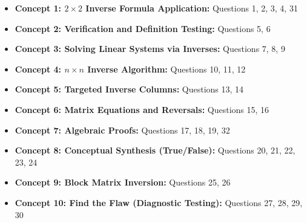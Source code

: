 \documentclass{article}
\begin{document}
\begin{itemize}
    \item \textbf{Concept 1: $2 \times 2$ Inverse Formula Application:} Questions 1, 2, 3, 4, 31
    \item \textbf{Concept 2: Verification and Definition Testing:} Questions 5, 6
    \item \textbf{Concept 3: Solving Linear Systems via Inverses:} Questions 7, 8, 9
    \item \textbf{Concept 4: $n \times n$ Inverse Algorithm:} Questions 10, 11, 12
    \item \textbf{Concept 5: Targeted Inverse Columns:} Questions 13, 14
    \item \textbf{Concept 6: Matrix Equations and Reversals:} Questions 15, 16
    \item \textbf{Concept 7: Algebraic Proofs:} Questions 17, 18, 19, 32
    \item \textbf{Concept 8: Conceptual Synthesis (True/False):} Questions 20, 21, 22, 23, 24
    \item \textbf{Concept 9: Block Matrix Inversion:} Questions 25, 26
    \item \textbf{Concept 10: Find the Flaw (Diagnostic Testing):} Questions 27, 28, 29, 30
\end{itemize}
\end{document}
